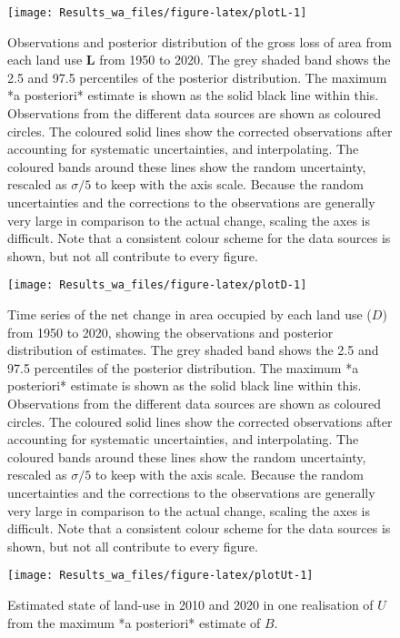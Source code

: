 \documentclass[
]{book}
\begin{document}
\begin{figure}
\texttt{[image: Results\_wa\_files/figure-latex/plotL-1]} \caption{ Observations and posterior distribution of the gross loss of area from each land use $\mathbf{L}$ from 1950 to 2020.  The grey shaded band shows the 2.5 and 97.5 percentiles of the posterior distribution. The maximum *a posteriori* estimate is shown as the solid black line within this. Observations from the different data sources are shown as coloured circles. The coloured solid lines show the corrected observations after accounting for systematic uncertainties, and interpolating. The coloured bands around these lines show the random uncertainty, rescaled as $\sigma /5$ to keep with the axis scale. Because the random uncertainties and the corrections to the observations are generally very large in comparison to the actual change, scaling the axes is difficult. Note that a consistent colour scheme for the data sources is shown, but not all contribute to every figure.}\label{fig:plotL}
\end{figure}

\begin{figure}
\texttt{[image: Results\_wa\_files/figure-latex/plotD-1]} \caption{ Time series of the net change in area occupied by each land use ($D$) from 1950 to 2020, showing the observations and posterior distribution of estimates. The grey shaded band shows the 2.5 and 97.5 percentiles of the posterior distribution. The maximum *a posteriori* estimate is shown as the solid black line within this. Observations from the different data sources are shown as coloured circles. The coloured solid lines show the corrected observations after accounting for systematic uncertainties, and interpolating. The coloured bands around these lines show the random uncertainty, rescaled as $\sigma /5$ to keep with the axis scale. Because the random uncertainties and the corrections to the observations are generally very large in comparison to the actual change, scaling the axes is difficult. Note that a consistent colour scheme for the data sources is shown, but not all contribute to every figure.}\label{fig:plotD}
\end{figure}

\begin{figure}
\texttt{[image: Results\_wa\_files/figure-latex/plotUt-1]} \caption{Estimated state of land-use in 2010 and 2020 in one realisation of $U$ from the maximum *a posteriori* estimate of $B$.}\label{fig:plotUt}
\end{figure}
\end{document}
